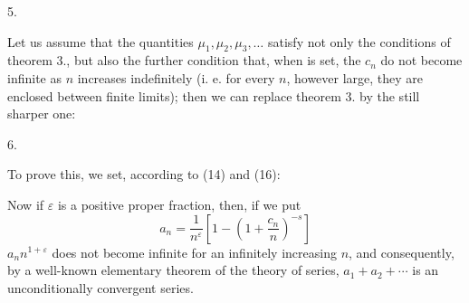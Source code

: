 5. 

Let us assume that the quantities $\mu_1, \mu_2, \mu_3, \ldots$ satisfy not only the conditions of theorem 3., but also the further condition that, when
is set, the $c_n$ do not become infinite as $n$ increases indefinitely (i. e. for every $n$, however large, they are enclosed between finite limits); then we can replace theorem 3. by the still sharper one:

6. 

To prove this, we set, according to (14) and (16):

Now if $\varepsilon$ is a positive proper fraction, then, if we put
\[
a_n = \frac{1}{n^\varepsilon}\left[1-\left(1+\frac{c_n}{n}\right)^{-s}\right]
\]
$a_n n^{1+\varepsilon}$ does not become infinite for an infinitely increasing $n$, and consequently, by a well-known elementary theorem of the theory of series, $a_1 + a_2 + \cdots$ is an unconditionally convergent series.
